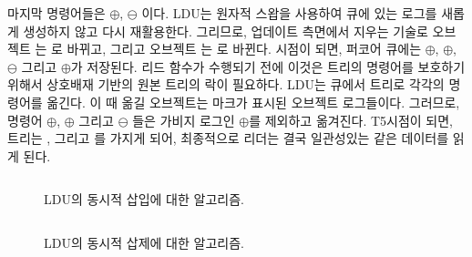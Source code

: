 마지막 명령어들은 $\oplus$, $\ominus$ 이다. 
LDU는 원자적 스왑을 사용하여 큐에 있는 로그를 새롭게 생성하지 않고 다시 재활용한다. 
그리므로, 업데이트 측면에서 지우는 기술로
 오브젝트 는 로 바뀌고, 그리고 오브젝트 는
로 바뀐다. 
 시점이 되면, 퍼코어 큐에는 $\oplus$, $\oplus$, $\ominus$ 
그리고 $\oplus$가 저장된다. 
리드 함수가 수행되기 전에 이것은 트리의 명령어를 보호하기 위해서
상호배재 기반의 원본 트리의 락이 필요하다. 
LDU는 큐에서 트리로 각각의 명령어를 옮긴다. 이 때 옮길 오브젝트는 마크가 표시된 
오브젝트 로그들이다.
그러므로, 명령어 $\oplus$, $\oplus$ 그리고 $\ominus$
들은 가비지 로그인 $\oplus$를 제외하고 옮겨진다. 
T5시점이 되면, 트리는 ,  그리고 를 가지게 되어, 
최종적으로 리더는 결국 일관성있는 같은 데이터를 읽게 된다. 

\begin{figure}[h!]
\begin{center}
\inputminted[linenos,fontsize=\footnotesize, tabsize=4]{c}{src/ldu_logical_a.c}
\end{center}
\caption{LDU의 동시적 삽입에 대한 알고리즘.}
\label{fig:gldulogicalupdate}
\end{figure}


\begin{figure}[h!]
\begin{center}
\inputminted[linenos,fontsize=\footnotesize, tabsize=4]{c}{src/ldu_logical_b.c}
\end{center}
\caption{LDU의 동시적 삽제에 대한 알고리즘.}
\label{fig:gldulogicalupdate}
\end{figure}


